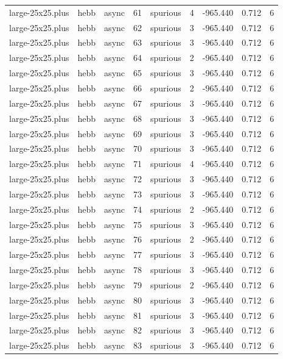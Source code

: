 \begin{tabular}{lllrlrrrr}
large-25x25.plus & hebb & async & 61 & spurious & 4 & -965.440 & 0.712 & 6 \\
large-25x25.plus & hebb & async & 62 & spurious & 3 & -965.440 & 0.712 & 6 \\
large-25x25.plus & hebb & async & 63 & spurious & 3 & -965.440 & 0.712 & 6 \\
large-25x25.plus & hebb & async & 64 & spurious & 2 & -965.440 & 0.712 & 6 \\
large-25x25.plus & hebb & async & 65 & spurious & 3 & -965.440 & 0.712 & 6 \\
large-25x25.plus & hebb & async & 66 & spurious & 2 & -965.440 & 0.712 & 6 \\
large-25x25.plus & hebb & async & 67 & spurious & 3 & -965.440 & 0.712 & 6 \\
large-25x25.plus & hebb & async & 68 & spurious & 3 & -965.440 & 0.712 & 6 \\
large-25x25.plus & hebb & async & 69 & spurious & 3 & -965.440 & 0.712 & 6 \\
large-25x25.plus & hebb & async & 70 & spurious & 3 & -965.440 & 0.712 & 6 \\
large-25x25.plus & hebb & async & 71 & spurious & 4 & -965.440 & 0.712 & 6 \\
large-25x25.plus & hebb & async & 72 & spurious & 3 & -965.440 & 0.712 & 6 \\
large-25x25.plus & hebb & async & 73 & spurious & 3 & -965.440 & 0.712 & 6 \\
large-25x25.plus & hebb & async & 74 & spurious & 2 & -965.440 & 0.712 & 6 \\
large-25x25.plus & hebb & async & 75 & spurious & 3 & -965.440 & 0.712 & 6 \\
large-25x25.plus & hebb & async & 76 & spurious & 2 & -965.440 & 0.712 & 6 \\
large-25x25.plus & hebb & async & 77 & spurious & 3 & -965.440 & 0.712 & 6 \\
large-25x25.plus & hebb & async & 78 & spurious & 3 & -965.440 & 0.712 & 6 \\
large-25x25.plus & hebb & async & 79 & spurious & 2 & -965.440 & 0.712 & 6 \\
large-25x25.plus & hebb & async & 80 & spurious & 3 & -965.440 & 0.712 & 6 \\
large-25x25.plus & hebb & async & 81 & spurious & 3 & -965.440 & 0.712 & 6 \\
large-25x25.plus & hebb & async & 82 & spurious & 3 & -965.440 & 0.712 & 6 \\
large-25x25.plus & hebb & async & 83 & spurious & 3 & -965.440 & 0.712 & 6 \\

\end{tabular}
